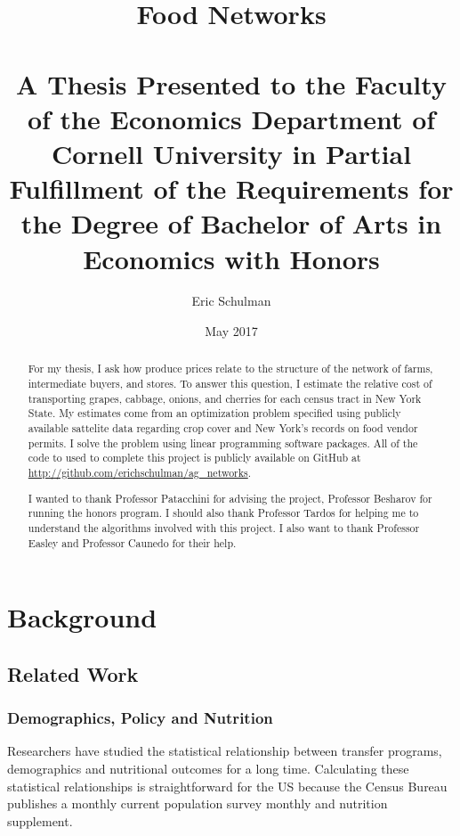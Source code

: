 \documentclass{report}
\title{Food Networks \\~\\ \normalsize A Thesis Presented to the Faculty of the Economics Department of Cornell University in Partial Fulfillment of the Requirements for the Degree of Bachelor of Arts in Economics with Honors}
\author{Eric Schulman}
\date{May 2017}
\begin{document}
\maketitle

\pagebreak

\begin{abstract}
For my thesis, I ask how produce prices relate to the structure of the network of farms, intermediate buyers, and stores. To answer this question, I estimate the relative cost of transporting grapes, cabbage, onions, and cherries for each census tract in New York State. My estimates come from an optimization problem specified using publicly available sattelite data regarding crop cover and New York's records on food vendor permits. I solve the problem using linear programming software packages. All of the code to used to complete this project is publicly available on GitHub at \url{http://github.com/erichschulman/ag_networks}.
\end{abstract}

\pagebreak

\renewcommand{\abstractname}{Acknowledgements}
\begin{abstract}
I wanted to thank Professor Patacchini for advising the project, Professor Besharov for running the honors program. I should also thank Professor Tardos for helping me to understand the algorithms involved with this project. I also want to thank Professor Easley and Professor Caunedo for their help. 
\end{abstract}

\tableofcontents

\chapter{Background}

\section{Related Work}

\subsection{Demographics, Policy and Nutrition}

Researchers have studied the statistical relationship between transfer programs, demographics and nutritional outcomes for a long time. Calculating these statistical relationships is straightforward for the US because the Census Bureau publishes a monthly current population survey monthly and nutrition supplement. 
\end{document}

